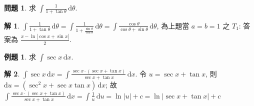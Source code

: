 \documentclass[12pt]{extarticle}
\newcommand{\ds}{\displaystyle}
\newcommand{\ie}{\;\Longrightarrow\;}
\theoremstyle{definition}
\newtheorem*{ex}{問題}
\newtheorem*{eg}{例題}
\newtheorem*{sol}{解}
\newcommand{\myline}{\noindent\makebox[\linewidth]{\rule{\paperwidth}{0.4pt}}}
\begin{document}
\myline

\begin{ex}
  求 $\ds\int\!\frac{1}{1 + \tan\theta}\,\text{d}\theta$.
\end{ex}

\begin{sol}
  $\ds\int\!\frac{1}{1 + \tan\theta}\,\text{d}\theta = \int\!\frac{1}{1 + \frac{\sin\theta}{\cos\theta}}\,\text{d}\theta = \int\!\frac{\cos\theta}{\cos\theta + \sin\theta}\,\text{d}\theta$, 為上題當 $a = b = 1$ 之 $T_1$: 答案為 $\ds\frac{x - \ln|\cos x + \sin x|}{2}$. 
\end{sol}

\myline

\begin{eg}
  求 $\ds\int\!\sec x\,\text{d}x$. 
\end{eg}

\begin{sol}
  $\ds\int\!\sec x\,\text{d}x = \int\!\frac{\sec x\cdot(\sec x + \tan x)}{\sec x + \tan x}\,\text{d}x$. 令 $u = \sec x + \tan x$, 則 $\ds\text{d}u = (\sec^2 x + \sec x\tan x)\,\text{d}x$; 故 $\ds\int\!\frac{\sec x\cdot(\sec x + \tan x)}{\sec x + \tan x}\,\text{d}x = \int\!\frac{1}{u}\,\text{d}u = \ln|u| + c = \ln|\sec x + \tan x| + c$
\end{sol}

%
\end{document}
